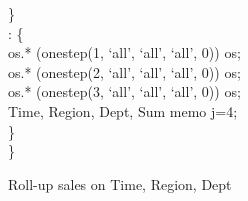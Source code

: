 {{\begin{algorithm}[!htb]
\begin{algorithmic}[1]
      \hspace{.3cm}\}\\
      \STATE\hspace{.3cm}: \{\\
      \STATE\hspace{.6cm}    os.*  (onestep(1, `all', `all', `all', 0))  os;\\
      \STATE\hspace{.6cm}    os.*  (onestep(2, `all', `all', `all', 0))  os;\\
      \STATE\hspace{.6cm}    os.*  (onestep(3, `all', `all', `all', 0))  os;\\
      \STATE\hspace{.6cm}    Time, Region, Dept, Sum  memo  j=4;\\
      \hspace{.3cm}\}\\
      \STATE\}\\
    \end{algorithmic}
    \caption{Roll-up  sales on Time, Region, Dept\label{alg:rollup}}
  \end{algorithm}
  }
}
